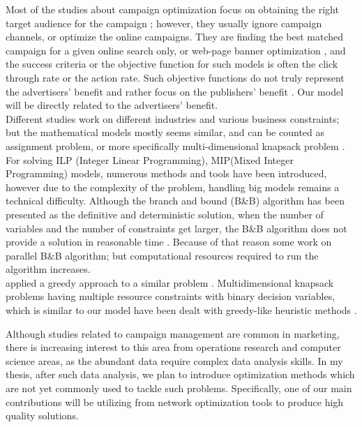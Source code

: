 \documentclass[11pt]{article}
\begin{document}
Most of the studies about campaign optimization focus on obtaining the right target audience for the campaign \citep{goul}; however, they usually ignore campaign channels, or optimize the online campaigns. They are finding the best matched campaign for a given online search only, or web-page banner optimization \citep{liu}, and the success criteria or the objective function for such models is often the click through rate or the action rate. Such objective functions do not truly represent the advertisers’ benefit and rather focus on the publishers’ benefit \citep{altshuler}. Our model will be directly related to the advertisers’ benefit.\\

Different studies work on different industries and various business constraints; but the mathematical models mostly seems similar, and can be counted as assignment problem, or more specifically multi-dimensional knapsack problem \citep{cohen_exp, oliveira_hypr}. For solving ILP (Integer Linear Programming), MIP(Mixed Integer Programming) models, numerous methods and tools have been introduced\citep{fallah_bb, chu_mip}, however due to the complexity of the problem, handling big models remains a technical difficulty. Although the branch and bound (B\&B) algorithm has been presented as the definitive and deterministic solution, when the number of variables and the number of constraints get larger, the B\&B algorithm does not provide a solution in reasonable time \citep{herrera_pbb, sato}. Because of that reason some work on parallel B\&B algorithm\citep{fallah_bb, sato}; but computational resources required to run the algorithm increases.\\ \citeauthor{cohen_exp} applied a greedy approach to a similar problem \citep{cohen_exp}. Multidimensional knapsack problems having multiple resource constraints with binary decision variables, which is similar to our model have been dealt with greedy-like heuristic methods \citep{akcay_mdkp}.

Although studies related to campaign management are common in marketing, there is increasing interest to this area from operations research and computer science areas, as the abundant data require complex data analysis skills. In my thesis, after such data analysis, we plan to introduce optimization methods which are not yet commonly used to tackle such problems. Specifically, one of our main contributions will be utilizing from network optimization tools to produce high quality solutions.\\
\end{document}
